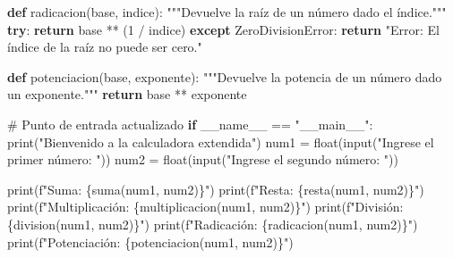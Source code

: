 \documentclass[
  a4paper,
  DIV=11,
  numbers=noendperiod,
  onepage,
  openany]{scrreprt}
\newenvironment{Shaded}{\begin{snugshade}}{\end{snugshade}}
\newcommand{\BuiltInTok}[1]{\textcolor[rgb]{0.00,0.23,0.31}{#1}}
\newcommand{\CommentTok}[1]{\textcolor[rgb]{0.37,0.37,0.37}{#1}}
\newcommand{\ControlFlowTok}[1]{\textcolor[rgb]{0.00,0.23,0.31}{\textbf{#1}}}
\newcommand{\DecValTok}[1]{\textcolor[rgb]{0.68,0.00,0.00}{#1}}
\newcommand{\KeywordTok}[1]{\textcolor[rgb]{0.00,0.23,0.31}{\textbf{#1}}}
\newcommand{\NormalTok}[1]{\textcolor[rgb]{0.00,0.23,0.31}{#1}}
\newcommand{\OperatorTok}[1]{\textcolor[rgb]{0.37,0.37,0.37}{#1}}
\newcommand{\PreprocessorTok}[1]{\textcolor[rgb]{0.68,0.00,0.00}{#1}}
\newcommand{\SpecialCharTok}[1]{\textcolor[rgb]{0.37,0.37,0.37}{#1}}
\newcommand{\SpecialStringTok}[1]{\textcolor[rgb]{0.13,0.47,0.30}{#1}}
\newcommand{\StringTok}[1]{\textcolor[rgb]{0.13,0.47,0.30}{#1}}
\newcommand{\VariableTok}[1]{\textcolor[rgb]{0.07,0.07,0.07}{#1}}
\begin{document}
\begin{Shaded}
\begin{Highlighting}[]
\KeywordTok{def}\NormalTok{ radicacion(base, indice):}
    \CommentTok{"""Devuelve la raíz de un número dado el índice."""}
    \ControlFlowTok{try}\NormalTok{:}
        \ControlFlowTok{return}\NormalTok{ base }\OperatorTok{**}\NormalTok{ (}\DecValTok{1} \OperatorTok{/}\NormalTok{ indice)}
    \ControlFlowTok{except} \PreprocessorTok{ZeroDivisionError}\NormalTok{:}
        \ControlFlowTok{return} \StringTok{"Error: El índice de la raíz no puede ser cero."}


\KeywordTok{def}\NormalTok{ potenciacion(base, exponente):}
    \CommentTok{"""Devuelve la potencia de un número dado un exponente."""}
    \ControlFlowTok{return}\NormalTok{ base }\OperatorTok{**}\NormalTok{ exponente}


\CommentTok{\# Punto de entrada actualizado}
\ControlFlowTok{if} \VariableTok{\_\_name\_\_} \OperatorTok{==} \StringTok{"\_\_main\_\_"}\NormalTok{:}
    \BuiltInTok{print}\NormalTok{(}\StringTok{"Bienvenido a la calculadora extendida"}\NormalTok{)}
\NormalTok{    num1 }\OperatorTok{=} \BuiltInTok{float}\NormalTok{(}\BuiltInTok{input}\NormalTok{(}\StringTok{"Ingrese el primer número: "}\NormalTok{))}
\NormalTok{    num2 }\OperatorTok{=} \BuiltInTok{float}\NormalTok{(}\BuiltInTok{input}\NormalTok{(}\StringTok{"Ingrese el segundo número: "}\NormalTok{))}

    \BuiltInTok{print}\NormalTok{(}\SpecialStringTok{f"Suma: }\SpecialCharTok{\{}\NormalTok{suma(num1, num2)}\SpecialCharTok{\}}\SpecialStringTok{"}\NormalTok{)}
    \BuiltInTok{print}\NormalTok{(}\SpecialStringTok{f"Resta: }\SpecialCharTok{\{}\NormalTok{resta(num1, num2)}\SpecialCharTok{\}}\SpecialStringTok{"}\NormalTok{)}
    \BuiltInTok{print}\NormalTok{(}\SpecialStringTok{f"Multiplicación: }\SpecialCharTok{\{}\NormalTok{multiplicacion(num1, num2)}\SpecialCharTok{\}}\SpecialStringTok{"}\NormalTok{)}
    \BuiltInTok{print}\NormalTok{(}\SpecialStringTok{f"División: }\SpecialCharTok{\{}\NormalTok{division(num1, num2)}\SpecialCharTok{\}}\SpecialStringTok{"}\NormalTok{)}
    \BuiltInTok{print}\NormalTok{(}\SpecialStringTok{f"Radicación: }\SpecialCharTok{\{}\NormalTok{radicacion(num1, num2)}\SpecialCharTok{\}}\SpecialStringTok{"}\NormalTok{)}
    \BuiltInTok{print}\NormalTok{(}\SpecialStringTok{f"Potenciación: }\SpecialCharTok{\{}\NormalTok{potenciacion(num1, num2)}\SpecialCharTok{\}}\SpecialStringTok{"}\NormalTok{)}
\end{Highlighting}
\end{Shaded}
\end{document}

